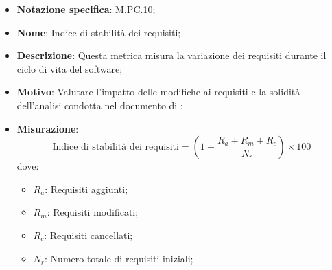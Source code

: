\begin{itemize}
    \item \textbf{Notazione specifica}: M.PC.10;
    \item \textbf{Nome}: Indice di stabilità dei requisiti;
    \item \textbf{Descrizione}: Questa metrica misura la variazione dei requisiti durante il ciclo di vita del software;
    \item \textbf{Motivo}: Valutare l'impatto delle modifiche ai requisiti e la solidità dell'analisi condotta nel documento di \VersioneAR;
    \item \textbf{Misurazione}:
    \[
        \text{Indice di stabilità dei requisiti} = (1 - \frac{R_a + R_m + R_c}{N_r}) \times 100
    \]
    dove:
    \begin{itemize}
      \item $R_{a}$: Requisiti aggiunti;
      \item $R_{m}$: Requisiti modificati;
      \item $R_{c}$: Requisiti cancellati;
      \item $N_{r}$: Numero totale di requisiti iniziali;
    \end{itemize}
\end{itemize}
